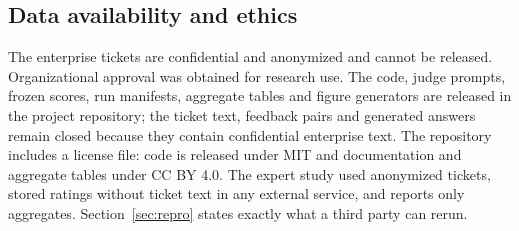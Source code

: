 \subsection{Data availability and ethics}
The enterprise tickets are confidential and anonymized and cannot be released.
Organizational approval was obtained for research use. The code, judge prompts,
frozen scores, run manifests, aggregate tables and figure generators are released in
the project repository; the ticket text, feedback pairs and generated answers remain
closed because they contain confidential enterprise text. The repository includes a
license file: code is released under MIT and documentation and aggregate tables
under CC BY 4.0. The expert study used anonymized tickets, stored ratings without
ticket text in any external service, and reports only aggregates. Section~\ref{sec:repro}
states exactly what a third party can rerun.
